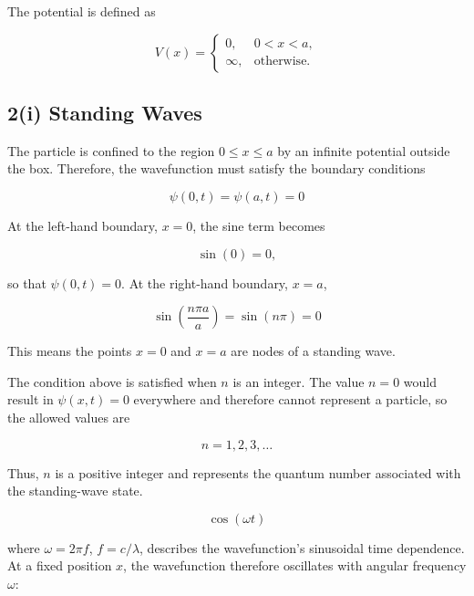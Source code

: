 \documentclass{article}
\begin{document}
The potential is defined as

\begin{equation*}
V(x)=
\begin{cases}
0, & 0<x<a,\\
\infty, & \text{otherwise}.
\end{cases}
\end{equation*}


\subsection*{2(i) Standing Waves}

The particle is confined to the region $0\leq x\leq a$ by an
infinite potential outside the box. Therefore, the wavefunction
must satisfy the boundary conditions

\begin{equation*}
\psi(0,t)=\psi(a,t)=0
\end{equation*}

At the left-hand boundary, $x=0$, the sine term becomes

\begin{equation*}
\sin(0)=0,
\end{equation*}

so that $\psi(0,t)=0$. At the right-hand boundary, $x=a$,

\begin{equation*}
\sin\left(\frac{n\pi a}{a}\right) = \sin(n\pi) = 0
\end{equation*}

This means the points $x=0$ and $x=a$ are nodes of a standing wave.

\vspace{1\baselineskip}

The condition above is satisfied when $n$ is an integer. The value
$n=0$ would result in $\psi(x,t)=0$ everywhere and therefore cannot
represent a particle, so the allowed values are

\begin{equation*}
\boxed{n=1,2,3,\ldots}
\end{equation*}

Thus, $n$ is a positive integer and represents the quantum number
associated with the standing-wave state.

\begin{equation*}
\cos(\omega t)
\end{equation*}

where $\omega = 2\pi f$, $f=c/\lambda$, describes the wavefunction's sinusoidal time dependence. At a fixed position $x$, the wavefunction therefore oscillates with angular frequency $\omega$:
\end{document}

